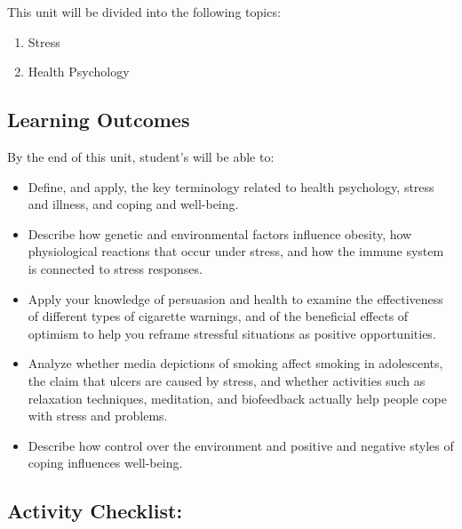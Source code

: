 \documentclass[
]{book}
\providecommand{\tightlist}{%
  \setlength{\itemsep}{0pt}\setlength{\parskip}{0pt}}
\begin{document}
This unit will be divided into the following topics:

\begin{enumerate}
\def\labelenumi{\arabic{enumi}.}
\tightlist
\item
  Stress\\
\item
  Health Psychology
\end{enumerate}

\hypertarget{learning-outcomes-8}{%
\subsection*{Learning Outcomes}\label{learning-outcomes-8}}

By the end of this unit, student's will be able to:

\begin{itemize}
\tightlist
\item
  Define, and apply, the key terminology related to health psychology, stress and illness, and coping and well-being.\\
\item
  Describe how genetic and environmental factors influence obesity, how physiological reactions that occur under stress, and how the immune system is connected to stress responses.\\
\item
  Apply your knowledge of persuasion and health to examine the effectiveness of different types of cigarette warnings, and of the beneficial effects of optimism to help you reframe stressful situations as positive opportunities.\\
\item
  Analyze whether media depictions of smoking affect smoking in adolescents, the claim that ulcers are caused by stress, and whether activities such as relaxation techniques, meditation, and biofeedback actually help people cope with stress and problems.\\
\item
  Describe how control over the environment and positive and negative styles of coping influences well-being.
\end{itemize}

\hypertarget{activity-checklist-8}{%
\subsection*{Activity Checklist:}\label{activity-checklist-8}}
\end{document}
